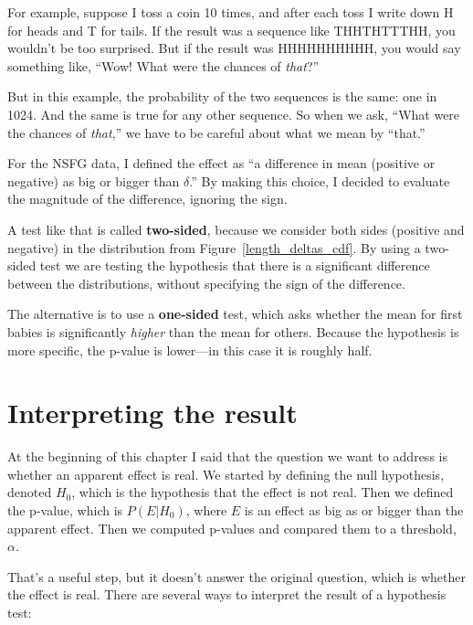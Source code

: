 \documentclass[12pt]{book}
\begin{document}
For example, suppose I toss a coin 10 times, and after each toss I
write down H for heads and T for tails.  If the result was a sequence
like THHTHTTTHH, you wouldn't be too surprised.  But if the result was
HHHHHHHHHH, you would say something like, ``Wow!  What were the
chances of {\em that}?''

But in this example, the probability of the two sequences is the
same: one in 1024.  And the same is true for any other sequence.
So when we ask, ``What were the chances of {\em that},'' we have
to be careful about what we mean by ``that.''

For the NSFG data, I defined the effect as ``a difference in mean
(positive or negative) as big or bigger than $\delta$.''  By making
this choice, I decided to evaluate the magnitude of the difference,
ignoring the sign.

A test like that is called {\bf two-sided}, because we consider both
sides (positive and negative) in the distribution from
Figure~\ref{length_deltas_cdf}.  By using a two-sided test we are
testing the hypothesis that there is a significant difference between
the distributions, without specifying the sign of the difference.

The alternative is to use a {\bf one-sided} test, which asks whether
the mean for first babies is significantly {\em higher} than
the mean for others.  Because the hypothesis is more specific, the
p-value is lower---in this case it is roughly half.


\section{Interpreting the result}

At the beginning of this chapter I said that the question we want to
address is whether an apparent effect is real.  We started by defining
the null hypothesis, denoted $H_0$, which is the
hypothesis that the effect is not real.  Then we defined the p-value,
which is $P(E | H_0)$, where $E$ is an effect as big as or bigger than
the apparent effect.  Then we computed p-values and compared
them to a threshold, $\alpha$.

That's a useful step, but it doesn't answer the original question,
which is whether the effect is real.  There are several ways to
interpret the result of a hypothesis test:
\end{document}
